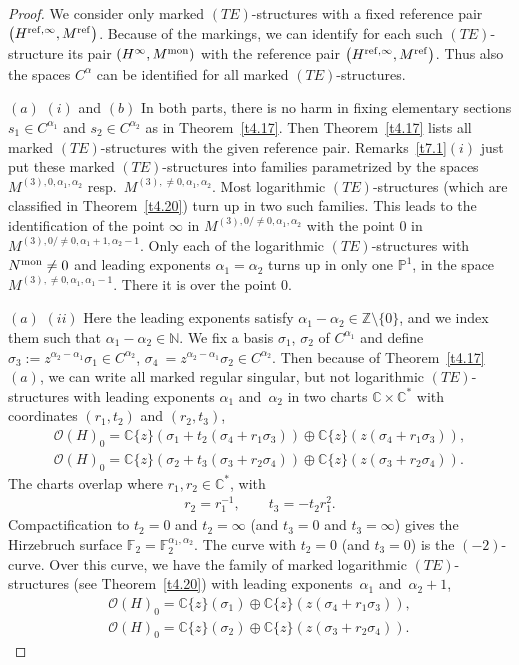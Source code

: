 \documentclass[10pt,a4paper]{amsart}
\numberwithin{equation}{section}
\numberwithin{figure}{section}
\newcommand{\N}{{\mathbb N}}
\newcommand{\Z}{{\mathbb Z}}
\newcommand{\C}{{\mathbb C}}
\renewcommand{\P}{{\mathbb P}}
\newcommand{\F}{{\mathbb F}}
\newcommand{\OO}{{\mathcal O}}
\begin{document}
\begin{proof}
We consider only marked $(TE)$-structures with a
fixed reference pair $\big(H^{{\rm ref},\infty},M^{\rm ref}\big)$.
Because of the markings, we can identify for each such
$(TE)$-structure its pair $(H^\infty,M^{\rm mon})$
with the reference pair $\big(H^{{\rm ref},\infty},M^{\rm ref}\big)$.
Thus also the spaces $C^\alpha$ can be identified
for all marked $(TE)$-structures.

$(a)$ $(i)$ and $(b)$ In both parts, there is no harm in fixing
elementary sections $s_1\in C^{\alpha_1}$ and
$s_2\in C^{\alpha_2}$ as in Theorem~\ref{t4.17}.
Then Theorem~\ref{t4.17} lists all marked $(TE)$-structures
with the given reference pair.
Remarks~\ref{t7.1}$(i)$ just put these marked
$(TE)$-structures into families parametrized by the spaces
$M^{(3),0,\alpha_1,\alpha_2}$ resp.~$M^{(3),\neq 0,\alpha_1,\alpha_2}$.
Most logarithmic $(TE)$-structures (which are classified
in Theorem~\ref{t4.20}) turn up in two such
families. This leads to the identification of the point
$\infty$ in $M^{(3),0/\neq 0,\alpha_1,\alpha_2}$
with the point $0$ in
$M^{(3),0/\neq 0,\alpha_1+1,\alpha_2-1}$.
Only each of the logarithmic $(TE)$-structures
with $N^{\rm mon}\neq 0$ and leading exponents
$\alpha_1=\alpha_2$ turns up in only one $\P^1$,
in the space $M^{(3),\neq 0,\alpha_1,\alpha_1-1}$.
There it is over the point $0$.


$(a)$ $(ii)$ Here the leading exponents satisfy
$\alpha_1-\alpha_2\in\Z\setminus\{0\}$, and we index them
such that $\alpha_1-\alpha_2\in\N$. We fix a basis
$\sigma_1$, $\sigma_2$ of $C^{\alpha_1}$
and define $\sigma_3:=z^{\alpha_2-\alpha_1}\sigma_1\in
C^{\alpha_2}$,
$\sigma_4\:=z^{\alpha_2-\alpha_1}\sigma_2\in C^{\alpha_2}$.
Then because of Theorem~\ref{t4.17}$(a)$,
we can write all marked regular singular, but not
logarithmic $(TE)$-structures with leading exponents
$\alpha_1$ and~$\alpha_2$ in two charts $\C\times\C^*$
with coordinates $(r_1,t_2)$ and $(r_2,t_3)$,
\begin{gather*}%
\OO(H)_0= \C\{z\}(\sigma_1+t_2(\sigma_4+r_1\sigma_3))\oplus \C\{z\}(z(\sigma_4+r_1\sigma_3)),
\\
\OO(H)_0= \C\{z\}(\sigma_2+t_3(\sigma_3+r_2\sigma_4))\oplus \C\{z\}(z(\sigma_3+r_2\sigma_4)).\nonumber
\end{gather*}
The charts overlap where $r_1,r_2\in\C^*$, with
\begin{gather*}%
r_2=r_1^{-1},\qquad
t_3=-t_2r_1^2.
\end{gather*}
Compactification to $t_2= 0$ and $t_2=\infty$
(and $t_3=0$ and $t_3=\infty$) gives
the Hirzebruch surface $\F_2=\F_2^{\alpha_1,\alpha_2}$.
The curve with $t_2=0$ (and $t_3=0$) is the $(-2)$-curve.
Over this curve, we have the family of marked logarithmic
$(TE)$-structures (see Theorem~\ref{t4.20}) with
leading exponents~$\alpha_1$ and~$\alpha_2+1$,
\begin{gather*}
\OO(H)_0= \C\{z\}(\sigma_1)\oplus \C\{z\}(z(\sigma_4+r_1\sigma_3)),
\\
\OO(H)_0= \C\{z\}(\sigma_2)\oplus \C\{z\}(z(\sigma_3+r_2\sigma_4)).
\end{gather*}


\end{proof}
\end{document}
